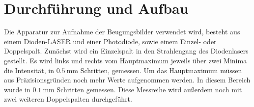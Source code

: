 \section{Durchführung und Aufbau}
\label{sec:Aufbau}
Die Apparatur zur Aufnahme der Beugungsbilder verwendet wird, besteht aus einem
Dioden-LASER und einer Photodiode, sowie einem Einzel- oder Doppelspalt.
Zunächst wird ein Einzelspalt in den Strahlengang des Diodenlasers gestellt.
Es wird links und rechts vom Hauptmaximum jeweils über zwei Minima die
Intensität, in $\SI{0.5}{\milli\meter}$ Schritten, gemessen. Um das
Hauptmaximum müssen aus Präzisionsgründen noch mehr Werte aufgenommen werden.
In diesem Bereich wurde in $\SI{0.1}{\milli\meter}$ Schritten gemessen.
Diese Messreihe wird außerdem noch mit zwei weiteren Doppelspalten durchgeführt.
